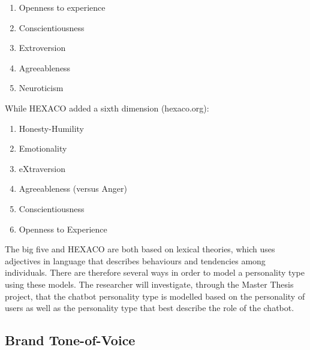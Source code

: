 \begin{enumerate}
    \item Openness to experience
    \item Conscientiousness
    \item Extroversion
    \item Agreeableness
    \item Neuroticism 
\end{enumerate}

While HEXACO added a sixth dimension (hexaco.org):
\begin{enumerate}
    \item Honesty-Humility
    \item Emotionality
    \item eXtraversion
    \item Agreeableness (versus Anger)
    \item Conscientiousness
    \item Openness to Experience
\end{enumerate}

The big five and HEXACO are both based on lexical theories, which uses adjectives in language that describes behaviours and tendencies among individuals. There are therefore several ways in order to model a personality type using these models. The researcher will investigate, through the Master Thesis project, that the chatbot personality type is modelled based on the personality of users as well as the personality type that best describe the role of the chatbot.

\vspace{5mm} %

\subsection{Brand Tone-of-Voice}

